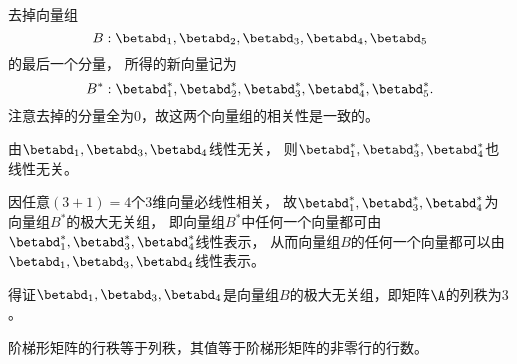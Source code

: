 \begin{figure}
  \centering
\end{figure}


去掉向量组
$$B:\betabd_1,\betabd_2,\betabd_3,\betabd_4,\betabd_5$$
的最后一个分量，
所得的新向量记为
$$B^*:\betabd_1^*,\betabd_2^*,\betabd_3^*,\betabd_4^*,\betabd_5^*.$$
注意去掉的分量全为$0$，故这两个向量组的相关性是一致的。

\vspace{0.1in}

由$\betabd_1,\betabd_3,\betabd_4$线性无关，
则$\betabd_1^*,\betabd_3^*,\betabd_4^*$也线性无关。

\vspace{0.1in}


因任意$(3+1)=4$个$3$维向量必线性相关，
故$\betabd_1^*,\betabd_3^*,\betabd_4^*$为向量组$B^*$的极大无关组，
即向量组$B^*$中任何一个向量都可由$\betabd_1^*,\betabd_3^*,\betabd_4^*$线性表示，
从而向量组$B$的任何一个向量都可以由$\betabd_1,\betabd_3,\betabd_4$线性表示。

\vspace{0.1in}

得证$\betabd_1,\betabd_3,\betabd_4$是向量组$B$的极大无关组，即矩阵$\A$的列秩为$3$。





\begin{jielun}
  阶梯形矩阵的行秩等于列秩，其值等于阶梯形矩阵的非零行的行数。
\end{jielun}






